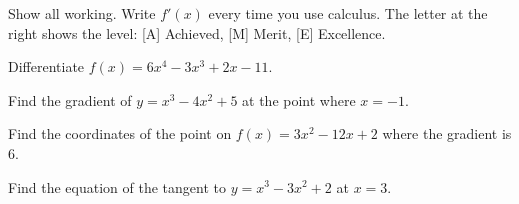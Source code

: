 \documentclass[11pt]{article}
\begin{document}
Show all working. Write $f'(x)$ every time you use calculus. The letter at the right shows the level: [A] Achieved, [M] Merit, [E] Excellence.

\Q Differentiate $f(x)=6x^{4}-3x^{3}+2x-11$.
\ALine{}

\Q Find the gradient of $y=x^{3}-4x^{2}+5$ at the point where $x=-1$.
\ALine{}

\Q Find the coordinates of the point on $f(x)=3x^{2}-12x+2$ where the gradient is $6$.

\Q Find the equation of the tangent to $y=x^{3}-3x^{2}+2$ at $x=3$.

\ppQ{[A]}




\ppQ{[M]}

\end{document}
